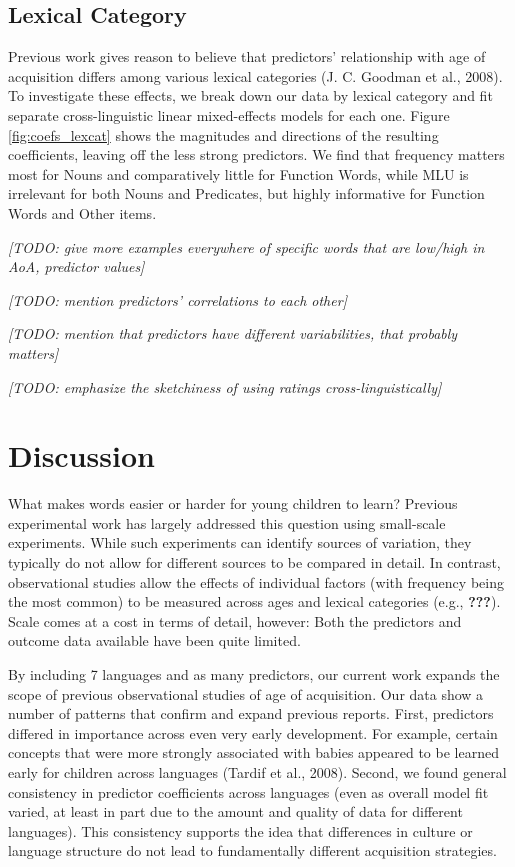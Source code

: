 \documentclass[10pt, letterpaper]{article}
\begin{document}
\subsection{Lexical Category}\label{lexical-category}

Previous work gives reason to believe that predictors' relationship with
age of acquisition differs among various lexical categories (J. C.
Goodman et al., 2008). To investigate these effects, we break down our
data by lexical category and fit separate cross-linguistic linear
mixed-effects models for each one. Figure \ref{fig:coefs_lexcat} shows
the magnitudes and directions of the resulting coefficients, leaving off
the less strong predictors. We find that frequency matters most for
Nouns and comparatively little for Function Words, while MLU is
irrelevant for both Nouns and Predicates, but highly informative for
Function Words and Other items.

\emph{{[}TODO: give more examples everywhere of specific words that are
low/high in AoA, predictor values{]}}

\emph{{[}TODO: mention predictors' correlations to each other{]}}

\emph{{[}TODO: mention that predictors have different variabilities,
that probably matters{]}}

\emph{{[}TODO: emphasize the sketchiness of using ratings
cross-linguistically{]}}

\section{Discussion}\label{discussion}

What makes words easier or harder for young children to learn? Previous
experimental work has largely addressed this question using small-scale
experiments. While such experiments can identify sources of variation,
they typically do not allow for different sources to be compared in
detail. In contrast, observational studies allow the effects of
individual factors (with frequency being the most common) to be measured
across ages and lexical categories (e.g., {\textbf{???}}). Scale comes
at a cost in terms of detail, however: Both the predictors and outcome
data available have been quite limited.

By including 7 languages and as many predictors, our current work
expands the scope of previous observational studies of age of
acquisition. Our data show a number of patterns that confirm and expand
previous reports. First, predictors differed in importance across even
very early development. For example, certain concepts that were more
strongly associated with babies appeared to be learned early for
children across languages (Tardif et al., 2008). Second, we found
general consistency in predictor coefficients across languages (even as
overall model fit varied, at least in part due to the amount and quality
of data for different languages). This consistency supports the idea
that differences in culture or language structure do not lead to
fundamentally different acquisition strategies.
\end{document}
